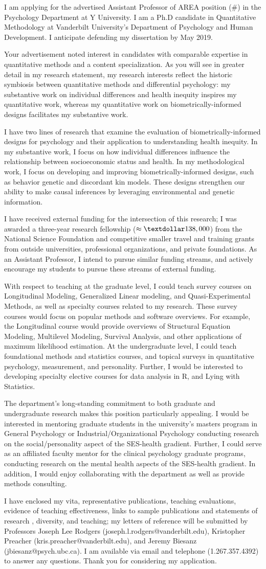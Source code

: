 \documentclass[11pt,stdletter,dateno,sigleft]{newlfm} %
\makeatletter
\newcommand{\R}{\textup{\textrm{R}}\xspace}
\newcommand{\myphone}{1.267.357.4392\xspace} %
\newcommand{\department}{Psychology Department\xspace} %
\newcommand{\university}{Y University\xspace} %
\newcommand{\job}{Assistant Professor\xspace} %
\newcommand{\positiontitle}{AREA\xspace} %
\newcommand{\positionnumber}{(\#)\xspace} %
\newcommand{\materials}{my vita, 
representative publications,
teaching evaluations,
evidence of teaching effectiveness,
links to sample publications
and statements of research 
, diversity,
and teaching} %
\newcommand{\refs}{Professors Joseph Lee Rodgers (joseph.l.rodgers@vanderbilt.edu), Kristopher Preacher (kris.preacher@vanderbilt.edu), and Jeremy Biesanz (jbiesanz@psych.ubc.ca)} %
\newcommand{\wishlist}{with comparable expertise in quantitative methods and a content specialization\xspace}
\newcommand{\tailoredwishlist}{interests reflect the historic symbiosis between quantitative methods and differential psychology: my substantive work on individual differences and health inequity inspires my quantitative work, whereas my quantitative work on biometrically-informed designs facilitates my substantive work.\xspace}
\newcommand{\researchprogram}{the evaluation of biometrically-informed designs for psychology and their application to understanding health inequity. In my substantive work, I focus on how individual differences influence the relationship between socioeconomic status and health. In my methodological work, I focus on developing and improving biometrically-informed designs, such as behavior genetic and discordant kin models. These designs strengthen our ability to make causal inferences by leveraging environmental and genetic information.\xspace}
\newcommand{\funding}{\xspace I have received external funding for the intersection of this research; I was awarded a three-year research fellowship ($\approx \textdollar 138,000$) from the National Science Foundation and competitive smaller travel and training grants from outside universities, professional organizations, and private foundations. As an Assistant Professor, I intend to pursue similar funding streams, and actively encourage my students to pursue these streams of external funding.\xspace}
\newcommand{\teachingprepgrad}{t the graduate level, I could teach survey courses on Longitudinal Modeling, Generalized Linear modeling, and Quasi-Experimental Methods, as well as specialty courses related to my research. These survey courses would focus on popular methods and software overviews. For example, the Longitudinal course would provide overviews of Structural Equation Modeling, Multilevel Modeling, Survival Analysis, and other applications of maximum likelihood estimation.\xspace}
\newcommand{\teachingprepugrad}{t the undergraduate level, I could teach foundational methods and statistics courses, and topical surveys in quantitative psychology, measurement, and personality. Further, I would be interested to developing specialty elective courses for data analysis in \R, and Lying with Statistics.\xspace}
\newcommand{\whyus}{The department's long-standing commitment to both graduate and undergraduate research makes this position particularly appealing. I would be interested in mentoring graduate students in the university's masters program in General Psychology or Industrial/Organizational Psychology conducting research on the social/personality aspect of the SES-health gradient. Further, I could serve as an affiliated faculty mentor for the clinical psychology graduate programs, conducting research on the mental health aspects of the SES-health gradient. In addition, I would enjoy collaborating with the department as well as provide methods consulting. \xspace}
\makeatother
\begin{document}
\begin{newlfm}


I am applying for the advertised \job of \positiontitle position \positionnumber in the \department at \university. I am a Ph.D candidate in Quantitative Methodology at Vanderbilt University's Department of Psychology and Human Development. I anticipate defending my dissertation by May 2019.

Your advertisement noted interest in candidates \wishlist. As you will see in greater detail in my research statement, my research \tailoredwishlist

I have two lines of research that examine \researchprogram

\funding

With respect to teaching a\teachingprepgrad A\teachingprepugrad

\whyus

I have enclosed \materials; my letters of reference will be submitted by \refs. I am available via email and telephone (\myphone) to answer any questions. Thank you for considering my application.

\end{newlfm}
\end{document}
